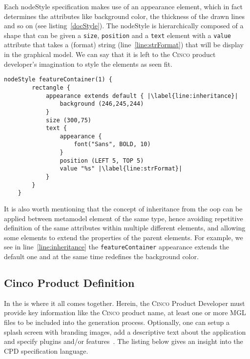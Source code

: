 Each nodeStyle specification makes use of an appearance element, which in fact determines the attributes like background color, the thickness of the drawn lines and so on (see listing~\ref{docStyle}). The nodeStyle is hierarchically composed of a shape that can be given a \lstinline[language=MGL]{size}, \lstinline[language=MGL]{position} and a \lstinline[language=MGL]{text} element with a \lstinline[language=MGL]{value} attribute that takes a (format) string (line~\ref{line:strFormat}) that will be display in the graphical model. We can say that it is left to the \textsc{Cinco} product developer's imagination to style the elements as seen fit.

\begin{lstlisting}[language=MGL, caption={Excerpt from feature.style to be applied to feature.mgl}, label=docStyle, escapechar=|, name=docMSL]
    nodeStyle featureContainer(1) {
        rectangle {
            appearance extends default { |\label{line:inheritance}|
                background (246,245,244)
            }
            size (300,75)
            text {
                appearance {
                    font("Sans", BOLD, 10)
                }
                position (LEFT 5, TOP 5)
                value "%s" |\label{line:strFormat}|
            }
        }
    }
\end{lstlisting}

It is also worth mentioning that the concept of inheritance from the \gls*{oop} can be applied between metamodel element of the same type, hence avoiding repetitive definition of the same attributes within multiple different elements, and allowing some elements to extend the properties of the parent elements. For example, we see in line~\ref{line:inheritance} the \lstinline{featureContainer} appearance extends the default one and at the same time redefines the background color.

\subsection{Cinco Product Definition}\label{sec:CPD}

In the  is where it all comes together. Herein, the \textsc{Cinco} Product Developer must provide key information like the \textsc{Cinco} product name, at least one or more MGL files to be included into the generation process. Optionally, one can setup a splash screen with branding images, add a descriptive text about the application and specify plugins and/or features~\cite{gitlabcinco}.
The listing below gives an insight into the CPD specification language.

